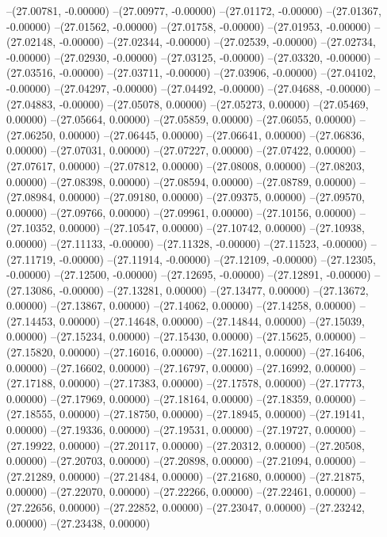 --(27.00781, -0.00000)
--(27.00977, -0.00000)
--(27.01172, -0.00000)
--(27.01367, -0.00000)
--(27.01562, -0.00000)
--(27.01758, -0.00000)
--(27.01953, -0.00000)
--(27.02148, -0.00000)
--(27.02344, -0.00000)
--(27.02539, -0.00000)
--(27.02734, -0.00000)
--(27.02930, -0.00000)
--(27.03125, -0.00000)
--(27.03320, -0.00000)
--(27.03516, -0.00000)
--(27.03711, -0.00000)
--(27.03906, -0.00000)
--(27.04102, -0.00000)
--(27.04297, -0.00000)
--(27.04492, -0.00000)
--(27.04688, -0.00000)
--(27.04883, -0.00000)
--(27.05078, 0.00000)
--(27.05273, 0.00000)
--(27.05469, 0.00000)
--(27.05664, 0.00000)
--(27.05859, 0.00000)
--(27.06055, 0.00000)
--(27.06250, 0.00000)
--(27.06445, 0.00000)
--(27.06641, 0.00000)
--(27.06836, 0.00000)
--(27.07031, 0.00000)
--(27.07227, 0.00000)
--(27.07422, 0.00000)
--(27.07617, 0.00000)
--(27.07812, 0.00000)
--(27.08008, 0.00000)
--(27.08203, 0.00000)
--(27.08398, 0.00000)
--(27.08594, 0.00000)
--(27.08789, 0.00000)
--(27.08984, 0.00000)
--(27.09180, 0.00000)
--(27.09375, 0.00000)
--(27.09570, 0.00000)
--(27.09766, 0.00000)
--(27.09961, 0.00000)
--(27.10156, 0.00000)
--(27.10352, 0.00000)
--(27.10547, 0.00000)
--(27.10742, 0.00000)
--(27.10938, 0.00000)
--(27.11133, -0.00000)
--(27.11328, -0.00000)
--(27.11523, -0.00000)
--(27.11719, -0.00000)
--(27.11914, -0.00000)
--(27.12109, -0.00000)
--(27.12305, -0.00000)
--(27.12500, -0.00000)
--(27.12695, -0.00000)
--(27.12891, -0.00000)
--(27.13086, -0.00000)
--(27.13281, 0.00000)
--(27.13477, 0.00000)
--(27.13672, 0.00000)
--(27.13867, 0.00000)
--(27.14062, 0.00000)
--(27.14258, 0.00000)
--(27.14453, 0.00000)
--(27.14648, 0.00000)
--(27.14844, 0.00000)
--(27.15039, 0.00000)
--(27.15234, 0.00000)
--(27.15430, 0.00000)
--(27.15625, 0.00000)
--(27.15820, 0.00000)
--(27.16016, 0.00000)
--(27.16211, 0.00000)
--(27.16406, 0.00000)
--(27.16602, 0.00000)
--(27.16797, 0.00000)
--(27.16992, 0.00000)
--(27.17188, 0.00000)
--(27.17383, 0.00000)
--(27.17578, 0.00000)
--(27.17773, 0.00000)
--(27.17969, 0.00000)
--(27.18164, 0.00000)
--(27.18359, 0.00000)
--(27.18555, 0.00000)
--(27.18750, 0.00000)
--(27.18945, 0.00000)
--(27.19141, 0.00000)
--(27.19336, 0.00000)
--(27.19531, 0.00000)
--(27.19727, 0.00000)
--(27.19922, 0.00000)
--(27.20117, 0.00000)
--(27.20312, 0.00000)
--(27.20508, 0.00000)
--(27.20703, 0.00000)
--(27.20898, 0.00000)
--(27.21094, 0.00000)
--(27.21289, 0.00000)
--(27.21484, 0.00000)
--(27.21680, 0.00000)
--(27.21875, 0.00000)
--(27.22070, 0.00000)
--(27.22266, 0.00000)
--(27.22461, 0.00000)
--(27.22656, 0.00000)
--(27.22852, 0.00000)
--(27.23047, 0.00000)
--(27.23242, 0.00000)
--(27.23438, 0.00000)
